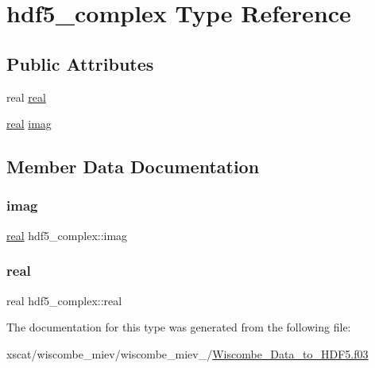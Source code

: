 \hypertarget{structhdf5__complex}{}\section{hdf5\+\_\+complex Type Reference}
\label{structhdf5__complex}
\subsection*{Public Attributes}
\begin{DoxyCompactItemize}
\item 
real \hyperlink{structhdf5__complex_a3c593bc85cccd0cddf83e3d3feaa52aa}{real}
\item 
\hyperlink{structhdf5__complex_a3c593bc85cccd0cddf83e3d3feaa52aa}{real} \hyperlink{structhdf5__complex_a1d940ac134936adbd69bb2623b3755f7}{imag}
\end{DoxyCompactItemize}


\subsection{Member Data Documentation}
\mbox{\label{structhdf5__complex_a1d940ac134936adbd69bb2623b3755f7}} 
\subsubsection{\texorpdfstring{imag}{imag}}
{\footnotesize\ttfamily \hyperlink{structhdf5__complex_a3c593bc85cccd0cddf83e3d3feaa52aa}{real} hdf5\+\_\+complex\+::imag}

\mbox{\label{structhdf5__complex_a3c593bc85cccd0cddf83e3d3feaa52aa}} 
\subsubsection{\texorpdfstring{real}{real}}
{\footnotesize\ttfamily real hdf5\+\_\+complex\+::real}



The documentation for this type was generated from the following file\+:\begin{DoxyCompactItemize}
\item 
xscat/wiscombe\+\_\+miev/wiscombe\+\_\+miev\+\_/\hyperlink{_wiscombe___data__to___h_d_f5_8f03}{Wiscombe\+\_\+\+Data\+\_\+to\+\_\+\+H\+D\+F5.\+f03}\end{DoxyCompactItemize}
